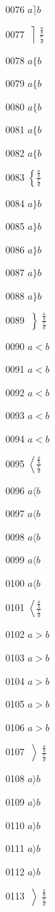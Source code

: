 \documentclass{article}
\begin{document}
0076 $a\Bigg\rceil b$\par
0077 $\left\rceil \frac{\frac{a}{b}}{\frac{c}{d}}\right.$\par
0078 $a\lbrace b$\par
0079 $a\big\lbrace b$\par
0080 $a\Big\lbrace b$\par
0081 $a\bigg\lbrace b$\par
0082 $a\Bigg\lbrace b$\par
0083 $\left\lbrace \frac{\frac{a}{b}}{\frac{c}{d}}\right.$\par
0084 $a\rbrace b$\par
0085 $a\big\rbrace b$\par
0086 $a\Big\rbrace b$\par
0087 $a\bigg\rbrace b$\par
0088 $a\Bigg\rbrace b$\par
0089 $\left\rbrace \frac{\frac{a}{b}}{\frac{c}{d}}\right.$\par
0090 $a<b$\par
0091 $a\big<b$\par
0092 $a\Big<b$\par
0093 $a\bigg<b$\par
0094 $a\Bigg<b$\par
0095 $\left<\frac{\frac{a}{b}}{\frac{c}{d}}\right.$\par
0096 $a\langle b$\par
0097 $a\big\langle b$\par
0098 $a\Big\langle b$\par
0099 $a\bigg\langle b$\par
0100 $a\Bigg\langle b$\par
0101 $\left\langle \frac{\frac{a}{b}}{\frac{c}{d}}\right.$\par
0102 $a>b$\par
0103 $a\big>b$\par
0104 $a\Big>b$\par
0105 $a\bigg>b$\par
0106 $a\Bigg>b$\par
0107 $\left>\frac{\frac{a}{b}}{\frac{c}{d}}\right.$\par
0108 $a\rangle b$\par
0109 $a\big\rangle b$\par
0110 $a\Big\rangle b$\par
0111 $a\bigg\rangle b$\par
0112 $a\Bigg\rangle b$\par
0113 $\left\rangle \frac{\frac{a}{b}}{\frac{c}{d}}\right.$\par
\end{document}
